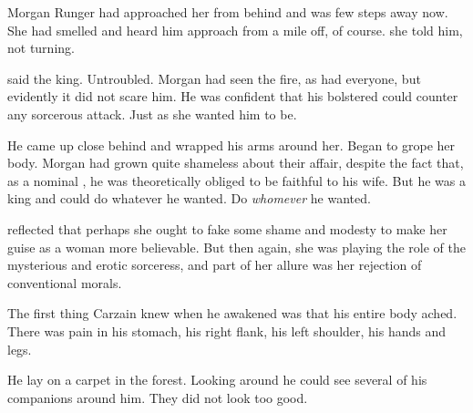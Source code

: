Morgan Runger had approached her from behind and was few steps away now. 
She had smelled and heard him approach from a mile off, of course. 
 she told him, not turning. 

 said the king. 
Untroubled. 
Morgan had seen the fire, as had everyone, but evidently it did not scare him. 
He was confident that his bolstered \ishrah{} could counter any sorcerous attack. 
Just as she wanted him to be. 

He came up close behind and wrapped his arms around her. 
Began to grope her body. 
Morgan had grown quite shameless about their affair, despite the fact that, as a nominal \Iquinian, he was theoretically obliged to be faithful to his wife. 
But he was a king and could do whatever he wanted. 
Do \emph{whomever} he wanted. 

\Takestsha{} reflected that perhaps she ought to fake some shame and modesty to make her guise as a \human{} woman more believable. 
But then again, she was playing the role of the mysterious and erotic sorceress, and part of her allure was her rejection of conventional morals. 








\begin{comment}
\subsection{Carzain awakens}
\end{comment}
\new
The first thing Carzain knew when he awakened was that his entire body ached. 
There was pain in his stomach, his right flank, his left shoulder, his hands and legs. 

He lay on a carpet in the forest. 
Looking around he could see several of his companions around him. 
They did not look too good. 

